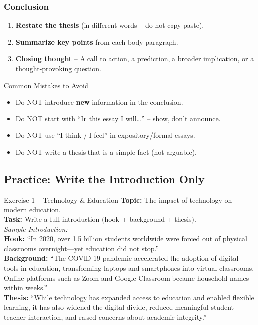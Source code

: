 \documentclass[12pt,a4paper]{article}
\begin{document}
\subsubsection{Conclusion}

\begin{enumerate}[noitemsep]
    \item \textbf{Restate the thesis} (in different words -- do not copy-paste).
    \item \textbf{Summarize key points} from each body paragraph.
    \item \textbf{Closing thought} -- A call to action, a prediction, a broader implication, or a thought-provoking question.
\end{enumerate}

\begin{warnbox}{Common Mistakes to Avoid}
\begin{itemize}[noitemsep]
    \item Do NOT introduce \textbf{new} information in the conclusion.
    \item Do NOT start with ``In this essay I will\ldots'' -- show, don't announce.
    \item Do NOT use ``I think / I feel'' in expository/formal essays.
    \item Do NOT write a thesis that is a simple fact (not arguable).
\end{itemize}
\end{warnbox}

\subsection{Practice: Write the Introduction Only}

\begin{practicebox}{Exercise 1 -- Technology \& Education}
\textbf{Topic:} The impact of technology on modern education.\\
\textbf{Task:} Write a full introduction (hook + background + thesis).\\[0.3cm]
\textit{Sample Introduction:}\\
\textbf{Hook:} ``In 2020, over 1.5 billion students worldwide were forced out of physical classrooms overnight---yet education did not stop.''\\
\textbf{Background:} ``The COVID-19 pandemic accelerated the adoption of digital tools in education, transforming laptops and smartphones into virtual classrooms. Online platforms such as Zoom and Google Classroom became household names within weeks.''\\
\textbf{Thesis:} ``While technology has expanded access to education and enabled flexible learning, it has also widened the digital divide, reduced meaningful student--teacher interaction, and raised concerns about academic integrity.''
\end{practicebox}
\end{document}
